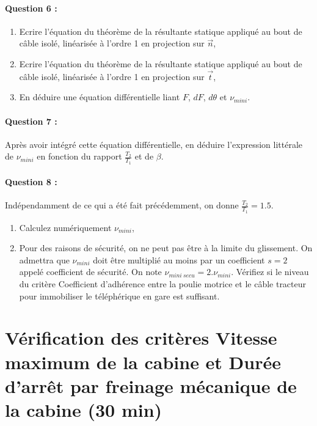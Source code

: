 \paragraph{Question 6 :}
	
\begin{enumerate}
 \item Ecrire l'équation du théorème de la résultante statique appliqué au bout de câble isolé, linéarisée à l'ordre 1 en projection sur $\overrightarrow{n}$,
 \item Ecrire l'équation du théorème de la résultante statique appliqué au bout de câble isolé, linéarisée à l'ordre 1 en projection sur $\overrightarrow{t}$,
 \item En déduire une équation différentielle liant $F$, $dF$, $d\theta$ et $\nu_{mini}$.
\end{enumerate}

\paragraph{Question 7 :} Après avoir intégré cette équation différentielle, en déduire l'expression littérale de $\nu_{mini}$ en fonction du rapport $\frac{T_2}{T_1}$ et de $\beta$.

\paragraph{Question 8 :} Indépendamment de ce qui a été fait précédemment, on donne $\frac{T_2}{T_1}=1.5$.

\begin{enumerate}
 \item Calculez numériquement $\nu_{mini}$,
 \item Pour des raisons de sécurité, on ne peut pas être à la limite du glissement. On admettra que $\nu_{mini}$ doit être multiplié au moins par un coefficient $s=2$ appelé coefficient de sécurité. On note $\nu_{mini\ secu}=2.\nu_{mini}$. Vérifiez si le niveau du critère \og Coefficient d'adhérence entre la poulie motrice et le câble tracteur pour immobiliser le téléphérique en gare \fg est suffisant.
\end{enumerate}

\section{Vérification des critères \og Vitesse maximum de la cabine \fg et \og Durée d'arrêt par freinage mécanique de la cabine \fg (30 min)}

